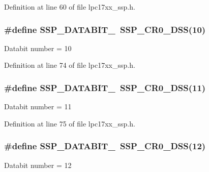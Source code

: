 \-Definition at line 60 of file lpc17xx\-\_\-ssp.\-h.

\hypertarget{group___s_s_p___public___macros_ga8e8220666e083d725cb5ca12863e3398}{
\subsubsection[{\-S\-S\-P\-\_\-\-D\-A\-T\-A\-B\-I\-T\-\_\-10}]{\setlength{\rightskip}{0pt plus 5cm}\#define {\bf \-S\-S\-P\-\_\-\-D\-A\-T\-A\-B\-I\-T\-\_}~{\bf \-S\-S\-P\-\_\-\-C\-R0\-\_\-\-D\-S\-S}(10)}}\label{group___s_s_p___public___macros_ga8e8220666e083d725cb5ca12863e3398}
\-Databit number = 10 

\-Definition at line 74 of file lpc17xx\-\_\-ssp.\-h.

\hypertarget{group___s_s_p___public___macros_ga4c54d482586fe521fc51fe2f660d92db}{
\subsubsection[{\-S\-S\-P\-\_\-\-D\-A\-T\-A\-B\-I\-T\-\_\-11}]{\setlength{\rightskip}{0pt plus 5cm}\#define {\bf \-S\-S\-P\-\_\-\-D\-A\-T\-A\-B\-I\-T\-\_}~{\bf \-S\-S\-P\-\_\-\-C\-R0\-\_\-\-D\-S\-S}(11)}}\label{group___s_s_p___public___macros_ga4c54d482586fe521fc51fe2f660d92db}
\-Databit number = 11 

\-Definition at line 75 of file lpc17xx\-\_\-ssp.\-h.

\hypertarget{group___s_s_p___public___macros_ga60cef3d2aa9a028b4e648abca8a20ea6}{
\subsubsection[{\-S\-S\-P\-\_\-\-D\-A\-T\-A\-B\-I\-T\-\_\-12}]{\setlength{\rightskip}{0pt plus 5cm}\#define {\bf \-S\-S\-P\-\_\-\-D\-A\-T\-A\-B\-I\-T\-\_}~{\bf \-S\-S\-P\-\_\-\-C\-R0\-\_\-\-D\-S\-S}(12)}}\label{group___s_s_p___public___macros_ga60cef3d2aa9a028b4e648abca8a20ea6}
\-Databit number = 12 


